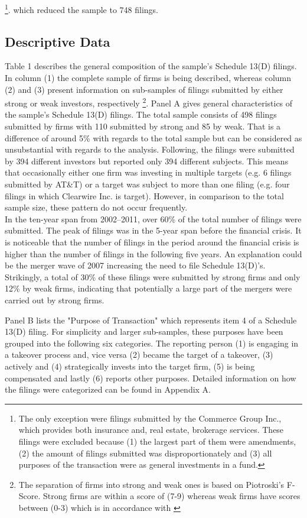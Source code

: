 \documentclass[12pt]{article}
\begin{document}
	\footnote{The only exception were filings submitted by the Commerce Group Inc., which provides both insurance and, real estate, brokerage services. These filings were excluded because (1) the largest part of them were amendments, (2) the amount of filings submitted was disproportionately and (3) all purposes of the transaction were as general investments in a fund.}.
which reduced the sample to 748 filings. 

\subsection{Descriptive Data}
Table 1 describes the general composition of the sample's Schedule 13(D) filings. In column (1) the complete sample of firms is being described, whereas column (2) and (3) present information on sub-samples of filings submitted by either strong or weak investors, respectively
	\footnote{The separation of firms into strong and weak ones is based on Piotroski's F-Score. Strong firms are within a score of (7-9) whereas weak firms have scores between (0-3) which is in accordance with \citet[p.12]{Mohr2012}}.
Panel A gives general characteristics of the sample's Schedule 13(D) filings. The total sample consists of 498 filings submitted by firms with 110 submitted by strong and 85 by weak. That is a difference of around 5\% with regards to the total sample but can be considered as unsubstantial with regards to the analysis. 
Following, the filings were submitted by 394 different investors but reported only 394 different subjects. This means that occasionally either one firm was investing in multiple targets (e.g. 6 filings submitted by AT\&T) or a target was subject to more than one filing (e.g. four filings in which Clearwire Inc. is target). However, in comparison to the total sample size, these pattern do not occur frequently.\\
In the ten-year span from 2002--2011, over 60\% of the total number of filings were submitted. The peak of filings was in the 5-year span before the financial crisis. It is noticeable that the number of filings in the period around the financial crisis is higher than the number of filings in the following five years. An explanation could be the merger wave of 2007 \citep[p.19]{Huang2017} increasing the need to file Schedule 13(D)'s. Strikingly, a total of 30\% of these filings were submitted by strong firms and only 12\% by weak firms, indicating that potentially a large part of the mergers were carried out by strong firms.
	
Panel B lists the "Purpose of Transaction" which represents item 4 of a Schedule 13(D) filing. For simplicity and larger sub-samples, these purposes have been grouped into the following six categories. The reporting person (1) is engaging in a takeover process and, vice versa (2) became the target of a takeover, (3) actively and (4) strategically invests into the target firm, (5) is being compensated and lastly (6) reports other purposes. Detailed information on how the filings were categorized can be found in Appendix A.
\end{document}

